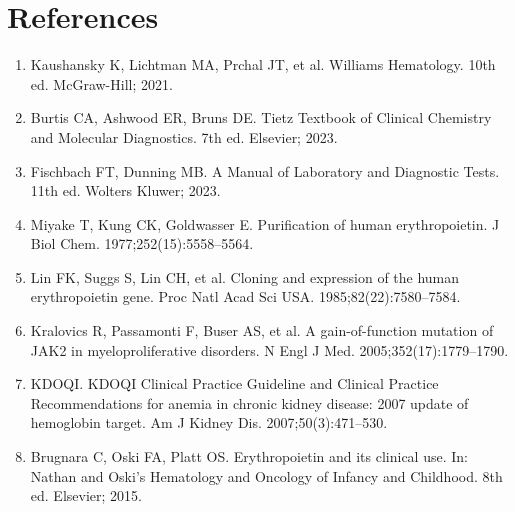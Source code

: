 \section*{References}
\begin{enumerate}
  \item Kaushansky K, Lichtman MA, Prchal JT, et al. Williams Hematology. 10th ed. McGraw-Hill; 2021.
  \item Burtis CA, Ashwood ER, Bruns DE. Tietz Textbook of Clinical Chemistry and Molecular Diagnostics. 7th ed. Elsevier; 2023.
  \item Fischbach FT, Dunning MB. A Manual of Laboratory and Diagnostic Tests. 11th ed. Wolters Kluwer; 2023.
  \item Miyake T, Kung CK, Goldwasser E. Purification of human erythropoietin. J Biol Chem. 1977;252(15):5558--5564.
  \item Lin FK, Suggs S, Lin CH, et al. Cloning and expression of the human erythropoietin gene. Proc Natl Acad Sci USA. 1985;82(22):7580--7584.
  \item Kralovics R, Passamonti F, Buser AS, et al. A gain-of-function mutation of JAK2 in myeloproliferative disorders. N Engl J Med. 2005;352(17):1779--1790.
  \item KDOQI. KDOQI Clinical Practice Guideline and Clinical Practice Recommendations for anemia in chronic kidney disease: 2007 update of hemoglobin target. Am J Kidney Dis. 2007;50(3):471--530.
  \item Brugnara C, Oski FA, Platt OS. Erythropoietin and its clinical use. In: Nathan and Oski's Hematology and Oncology of Infancy and Childhood. 8th ed. Elsevier; 2015.
\end{enumerate}

\clearpage

